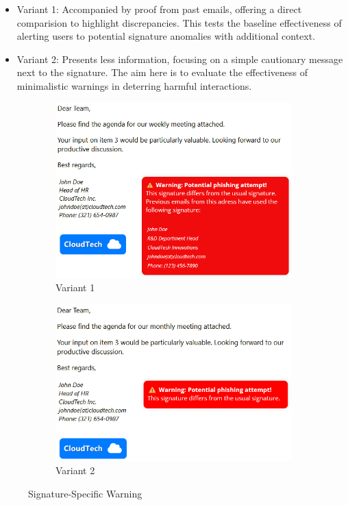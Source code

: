\documentclass[
  a4paper,  %
  twoside,  %
  bibliography=totoc,
  headsepline,
  cleardoublepage=empty,
  parskip=half,
  draft=false
]{scrbook}
\begin{document}
\begin{itemize}
    \item Variant 1: Accompanied by proof from past emails, offering a direct comparision to highlight discrepancies. This tests the baseline effectiveness of alerting users to potential signature anomalies with additional context.
    \item Variant 2: Presents less information, focusing on a simple cautionary message next to the signature. The aim here is to evaluate the effectiveness of minimalistic warnings in deterring harmful interactions.
\end{itemize}

\begin{figure} [H]
\centering
\begin{subfigure}{.5\textwidth}
  \centering
  \includegraphics[width=.9\linewidth]{figures/signature1.png}
  \caption{Variant 1}
  \label{fig:sig1}
\end{subfigure}%
\begin{subfigure}{.5\textwidth}
  \centering
  \includegraphics[width=.9\linewidth]{figures/signature2.png}
  \caption{Variant 2}
  \label{fig:sig2}
\end{subfigure}
\caption{Signature-Specific Warning}
\label{fig:signature}
\end{figure}
\end{document}
